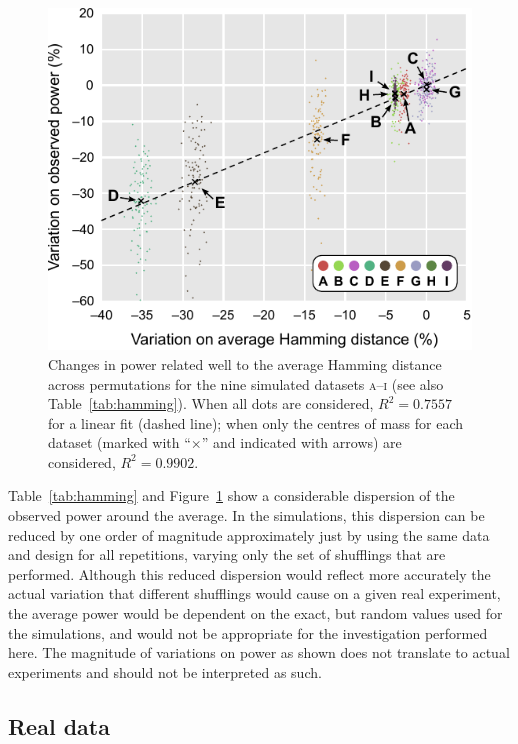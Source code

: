 \begin{figure}[!tp]
\centering
\includegraphics{figures/hamming.pdf}
\caption[Relationship between Hamming distance and power.]{Changes in power related well to the average Hamming distance across permutations for the nine simulated datasets \textsc{a}--\textsc{i} (see also Table~\ref{tab:hamming}). When all dots are considered, $R^2 = 0.7557$ for a linear fit (dashed line); when only the centres of mass for each dataset (marked with ``$\times$'' and indicated with arrows) are considered, $R^2 = 0.9902$.}
\label{fig:hamming}
\end{figure}

Table~\ref{tab:hamming} and Figure~\ref{fig:hamming} show a considerable dispersion of the observed power around the average. In the simulations, this dispersion can be reduced by one order of magnitude approximately just by using the same data and design for all repetitions, varying only the set of shufflings that are performed. Although this reduced dispersion would reflect more accurately the actual variation that different shufflings would cause on a given real experiment, the average power would be dependent on the exact, but random values used for the simulations, and would not be appropriate for the investigation performed here. The magnitude of variations on power as shown does not translate to actual experiments and should not be interpreted as such.

\subsection{Real data}


